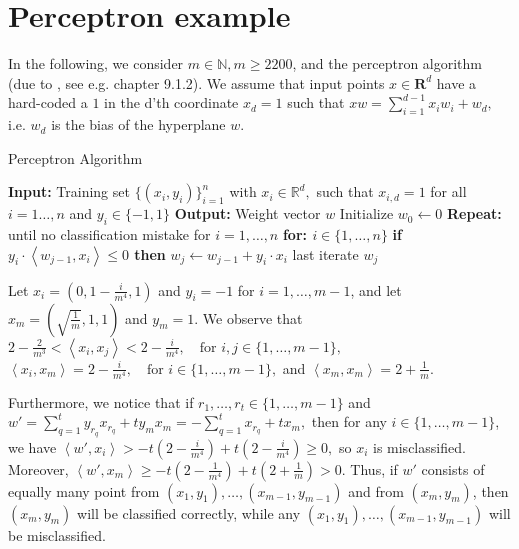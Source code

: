 
\section{Perceptron example}\label{appendix:perceptron}
In the following, we consider $m \in \mathbb{N}, m \geq 2200$, and the perceptron algorithm (due to \cite{Rosenblatt1958ThePA}, see e.g. \cite{understandingmachinelearning} chapter 9.1.2). We assume that input points $ x\in \mathbf{R}^{d} $  have a hard-coded a $ 1 $ in the d'th coordinate $ x_{d}=1 $ such that $ xw=\sum_{i=1}^{d-1}x_{i}w_{i}+w_{d},$ i.e. $ w_{d} $ is the bias of the hyperplane $ w.$      
\begin{algorithm}[H]
\caption{Perceptron Algorithm}\label{alg:perceptron}
\begin{algorithmic}[1]
\State \textbf{Input:} Training set $\{(x_i, y_i)\}_{i=1}^n$ with $x_i \in \mathbb{R}^d,$ such that $ x_{i,d}=1 $ for all $ i=1\ldots,n $  and $y_i \in \{-1, 1\}$
\State \textbf{Output:} Weight vector $w$
\State Initialize $w_0 \leftarrow 0$
\State \textbf{Repeat:} until no classification mistake for $i = 1, \ldots, n$
\State\hspace{0.5cm}\vline\quad \textbf{for: $i \in\{ 1, \ldots, n\}$}
\State\hspace{1cm}\vline\quad\textbf{if $y_i \cdot \left\langle w_{j-1}, x_i \right\rangle \leq 0$ then}
\State\hspace{1.5cm}\vline\quad $w_j \leftarrow w_{j-1} + y_i \cdot x_i$
\State \Return last iterate $w_j$
\end{algorithmic}
\end{algorithm}


Let $x_i = \left(0, 1 - \frac{i}{m^4},1\right)$ and $y_i = -1$ for $i = 1, \ldots, m-1$, and let $x_m = \left(\sqrt{\frac{1}{m}}, 1,1\right)$ and $y_m = 1$. We observe that 
$
2 - \frac{2}{m^3} < \left\langle x_i, x_j \right\rangle < 2 - \frac{i}{m^4}, \quad \text{for } i, j \in \{1, \ldots, m-1\},
$
$
\left\langle x_i, x_m \right\rangle = 2 - \frac{i}{m^4}, \quad \text{for } i \in \{1, \ldots, m-1\},
$
and 
$
\left\langle x_m, x_m \right\rangle = 2 + \frac{1}{m}.
$

Furthermore, we notice that if $r_1, \ldots, r_t \in \{1, \ldots, m-1\}$ and 
$
w' = \sum_{q=1}^t y_{r_q} x_{r_q} + t y_m x_m = -\sum_{q=1}^t x_{r_q} + t x_m,
$
then for any $i \in \{1, \ldots, m-1\}$, we have 
$
\left\langle w', x_i \right\rangle > -t\left(2 - \frac{i}{m^4}\right) + t\left(2 - \frac{i}{m^4}\right) \geq 0,
$
so $x_i$ is misclassified. Moreover, 
$
\left\langle w', x_m \right\rangle \geq -t\left(2 - \frac{1}{m^4}\right) + t\left(2 + \frac{1}{m}\right) > 0.
$
Thus, if $w'$ consists of equally many point from $(x_1, y_1), \ldots, (x_{m-1}, y_{m-1})$ and from $(x_m, y_m)$, then $(x_m, y_m)$ will be classified correctly, while any $(x_1, y_1), \ldots, (x_{m-1}, y_{m-1})$ will be misclassified. 

